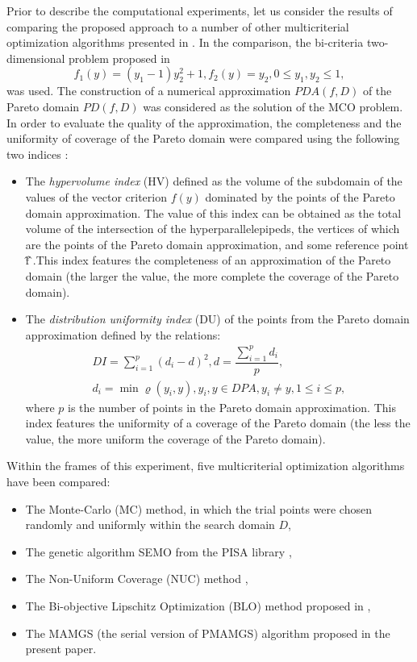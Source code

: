 \documentclass[procedia]{easychair}
\begin{document}
Prior to describe the computational experiments, let us consider the results of comparing the proposed approach to a number of other multicriterial optimization algorithms presented in \cite{c14}. In the comparison, the bi-criteria two-dimensional problem proposed in \cite{c9}
\begin{equation}\label{eq:17}
f_1 (y)=(y_1-1) y_2^2+1, f_2 (y)=y_2, 0 \leq y_1,y_2 \leq 1,
\end{equation}
was used. The construction of a numerical approximation $PDA(f,D)$ of the Pareto domain $PD(f,D)$ was considered as the solution of the MCO problem. In order to evaluate the quality of the approximation, the completeness and the uniformity of coverage of the Pareto domain were compared using the following two indices \cite{c9,c42}:
\begin{itemize}
	\item 	The {\it hypervolume index} (HV) defined as the volume of the subdomain of the values of the vector criterion $f(y)$ dominated by the points of the Pareto domain approximation. The value of this index can be obtained as the total volume of the intersection of the hyperparallelepipeds, the vertices of which are the points of the Pareto domain approximation, and some reference point \^{f} ̂.This index features the completeness of an approximation of the Pareto domain (the larger the value, the more complete the coverage of the Pareto domain).
	\item 	The {\it distribution uniformity index} (DU) of the points from the Pareto domain approximation defined by the relations:
\begin{equation*}
\begin{matrix}
DI=\sum_{i=1}^p{(d_i-d)^2} , d=\dfrac{ \sum_{i=1}^p{d_i} }{p}, \\
d_i=\min {\varrho(y_i,y)}, y_i,y \in DPA, y_i \neq y, 1 \leq i \leq p,
\end{matrix}
\end{equation*}
where $p$ is the number of points in the Pareto domain approximation. This index features the uniformity of a coverage of the Pareto domain (the less the value, the more uniform the coverage of the Pareto domain).

\end{itemize}
Within the frames of this experiment, five multicriterial optimization algorithms have been compared:
\begin{itemize}
\item The Monte-Carlo (MC) method, in which the trial points were chosen randomly and uniformly within the search domain $D$,
\item The genetic algorithm SEMO from the PISA library \cite{c20,c42},
\item The Non-Uniform Coverage (NUC) method \cite{c20},
\item The Bi-objective Lipschitz Optimization (BLO) method proposed in \cite{c42},
\item The MAMGS (the serial version of PMAMGS) algorithm proposed in the present paper.
\end{itemize}
\end{document}
